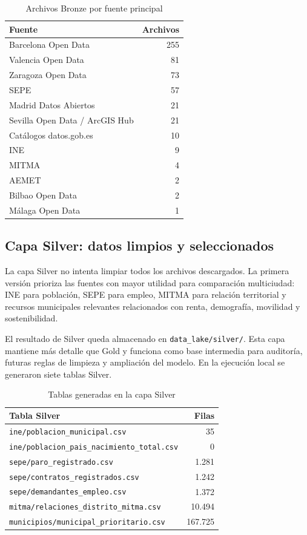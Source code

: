 \begin{table}[htbp]
\caption{Archivos Bronze por fuente principal}
\label{tab:bronze-fuentes}
\centering
\begin{tabular}{lr}
\toprule
\textbf{Fuente} & \textbf{Archivos} \\
\midrule
Barcelona Open Data & 255 \\
Valencia Open Data & 81 \\
Zaragoza Open Data & 73 \\
SEPE & 57 \\
Madrid Datos Abiertos & 21 \\
Sevilla Open Data / ArcGIS Hub & 21 \\
Catálogos datos.gob.es & 10 \\
INE & 9 \\
MITMA & 4 \\
AEMET & 2 \\
Bilbao Open Data & 2 \\
Málaga Open Data & 1 \\
\bottomrule
\end{tabular}
\end{table}

\subsection{Capa Silver: datos limpios y seleccionados}

La capa Silver no intenta limpiar todos los archivos descargados. La primera versión prioriza las fuentes con mayor utilidad para comparación multiciudad: INE para población, SEPE para empleo, MITMA para relación territorial y recursos municipales relevantes relacionados con renta, demografía, movilidad y sostenibilidad.

El resultado de Silver queda almacenado en \texttt{data\_lake/silver/}. Esta capa mantiene más detalle que Gold y funciona como base intermedia para auditoría, futuras reglas de limpieza y ampliación del modelo. En la ejecución local se generaron siete tablas Silver.

\begin{table}[htbp]
\caption{Tablas generadas en la capa Silver}
\label{tab:silver-resultados}
\centering
\begin{tabular}{lr}
\toprule
\textbf{Tabla Silver} & \textbf{Filas} \\
\midrule
\texttt{ine/poblacion\_municipal.csv} & 35 \\
\texttt{ine/poblacion\_pais\_nacimiento\_total.csv} & 0 \\
\texttt{sepe/paro\_registrado.csv} & 1.281 \\
\texttt{sepe/contratos\_registrados.csv} & 1.242 \\
\texttt{sepe/demandantes\_empleo.csv} & 1.372 \\
\texttt{mitma/relaciones\_distrito\_mitma.csv} & 10.494 \\
\texttt{municipios/municipal\_prioritario.csv} & 167.725 \\
\bottomrule
\end{tabular}
\end{table}

